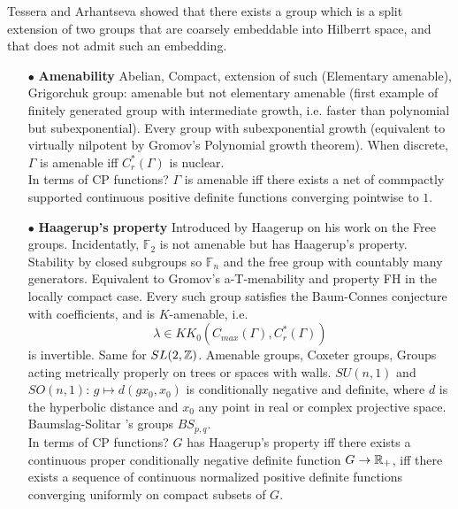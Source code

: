 Tessera and Arhantseva showed that there exists a group which is a split extension of two groups that are coarsely embeddable into Hilberrt space, and that does not admit such an embedding.\\

\begin{itemize}
\item[$\bullet$] \textbf{Amenability} Abelian, Compact, extension of such (Elementary amenable), Grigorchuk group: amenable but not elementary amenable (first example of finitely generated group with intermediate growth, i.e. faster than polynomial but subexponential). Every group with subexponential growth (equivalent to virtually nilpotent by Gromov's Polynomial growth theorem). When discrete, $\Gamma$ is amenable iff $C^*_r(\Gamma)$ is nuclear.\\

In terms of CP functions? $\Gamma$ is amenable iff there exists a net of commpactly supported continuous positive definite functions converging pointwise to $1$.\\

\item[$\bullet$] \textbf{Haagerup's property} Introduced by Haagerup on his work on the Free groups. Incidentatly, $\mathbb F_2$ is not amenable but has Haagerup's property. Stability by closed subgroups so $\mathbb F_ n$ and the free group with countably many generators. Equivalent to Gromov's a-T-menability and property FH in the locally compact case. Every such group satisfies the Baum-Connes conjecture with coefficients, and is $K$-amenable, i.e. 
\[\lambda \in KK_0(C_{max}(\Gamma), C^*_r(\Gamma))\] 
is invertible. Same for $SL(2,\mathbb Z)$. Amenable groups, Coxeter groups, Groups acting metrically properly on trees or spaces with walls. $SU(n,1)$ and $SO(n,1)$: $g\mapsto d(gx_0,x_0)$ is conditionally negative and definite, where $d$ is the hyperbolic distance and $x_0$ any point in real or complex projective space. Baumslag-Solitar 's groups $BS_{p,q}$.\\

In terms of CP functions? $G$ has Haagerup's property iff there exists a continuous proper conditionally negative definite function $G\rightarrow \mathbb R_+$, iff there exists a sequence of continuous normalized positive definite functions converging uniformly on compact subsets of $G$. \\


\end{itemize}
